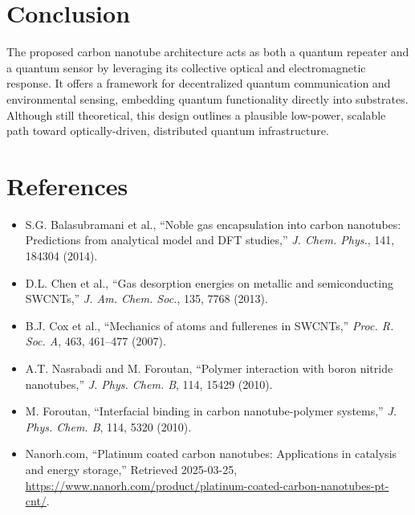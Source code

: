 \documentclass[11pt]{article}
\begin{document}
	\section{Conclusion}
	The proposed carbon nanotube architecture acts as both a quantum repeater and a quantum sensor by leveraging its collective optical and electromagnetic response. It offers a framework for decentralized quantum communication and environmental sensing, embedding quantum functionality directly into substrates. Although still theoretical, this design outlines a plausible low-power, scalable path toward optically-driven, distributed quantum infrastructure.
	
	\section{References}
	\begin{itemize}
		\item S.G. Balasubramani et al., ``Noble gas encapsulation into carbon nanotubes: Predictions from analytical model and DFT studies,'' \textit{J. Chem. Phys.}, 141, 184304 (2014).
		\item D.L. Chen et al., ``Gas desorption energies on metallic and semiconducting SWCNTs,'' \textit{J. Am. Chem. Soc.}, 135, 7768 (2013).
		\item B.J. Cox et al., ``Mechanics of atoms and fullerenes in SWCNTs,'' \textit{Proc. R. Soc. A}, 463, 461--477 (2007).
		\item A.T. Nasrabadi and M. Foroutan, ``Polymer interaction with boron nitride nanotubes,'' \textit{J. Phys. Chem. B}, 114, 15429 (2010).
		\item M. Foroutan, ``Interfacial binding in carbon nanotube-polymer systems,'' \textit{J. Phys. Chem. B}, 114, 5320 (2010).
		\item Nanorh.com, ``Platinum coated carbon nanotubes: Applications in catalysis and energy storage,'' Retrieved 2025-03-25, \url{https://www.nanorh.com/product/platinum-coated-carbon-nanotubes-pt-cnt/}.
	\end{itemize}
	
\end{document}
